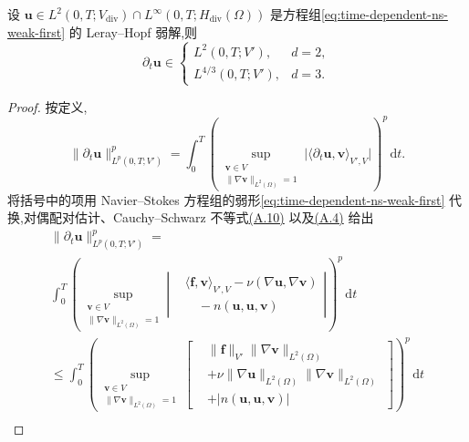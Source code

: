 \begin{lemma}[时间导数的正则性]\label{lem:time-dependent-time-derivative-regularity}
设 $\bm{u}\in L^2(0,T;V_{\mathrm{div}})\cap L^\infty(0,T;H_{\mathrm{div}}(\Omega))$ 是方程组\cref{eq:time-dependent-ns-weak-first} 的 Leray--Hopf 弱解,则
\begin{equation}\label{eq:time-dependent-time-derivative-regularity}
  \partial_t\bm{u}\in
  \begin{cases}
    L^2(0,T;V'),&d=2,\\
    L^{4/3}(0,T;V'),&d=3.
  \end{cases}
\end{equation}
\begin{proof}
按定义,
\[
  \|\partial_t\bm{u}\|_{L^p(0,T;V')}^p
  =\int_0^T\left(
      \sup_{\substack{\bm{v}\in V\\
                      \|\nabla\bm{v}\|_{L^2(\Omega)}=1}}
      \bigl|\langle\partial_t\bm{u},\bm{v}\rangle_{V',V}\bigr|
    \right)^p\,\mathrm{d}t.
\]
将括号中的项用 Navier--Stokes 方程组的弱形\cref{eq:time-dependent-ns-weak-first} 代换,对偶配对估计、Cauchy--Schwarz 不等式\hyperref[eq:appendix-a-10]{(A.10)} 以及\hyperref[eq:appendix-a-4]{(A.4)} 给出
\begin{equation}\label{eq:time-dependent-time-derivative-estimate}
\begin{gathered}
  \|\partial_t\bm{u}\|_{L^p(0,T;V')}^p
  =\\
  \int_0^T\left(
      \sup_{\substack{\bm{v}\in V\\
                      \|\nabla\bm{v}\|_{L^2(\Omega)}=1}}
      \left|
        \begin{aligned}
          &\langle\bm{f},\bm{v}\rangle_{V',V}
            -\nu(\nabla\bm{u},\nabla\bm{v})\\
          &\quad-n(\bm{u},\bm{u},\bm{v})
        \end{aligned}
      \right|
    \right)^p\,\mathrm{d}t\\
  \le\int_0^T\left(
      \sup_{\substack{\bm{v}\in V\\
                      \|\nabla\bm{v}\|_{L^2(\Omega)}=1}}
      \left[
        \begin{aligned}
          &\|\bm{f}\|_{V'}\|\nabla\bm{v}\|_{L^2(\Omega)}\\
          &+\nu\|\nabla\bm{u}\|_{L^2(\Omega)}
                \|\nabla\bm{v}\|_{L^2(\Omega)}\\
          &+|n(\bm{u},\bm{u},\bm{v})|
        \end{aligned}
      \right]
    \right)^p\,\mathrm{d}t\\

\end{gathered}
\end{equation}
\end{proof}
\end{lemma}
